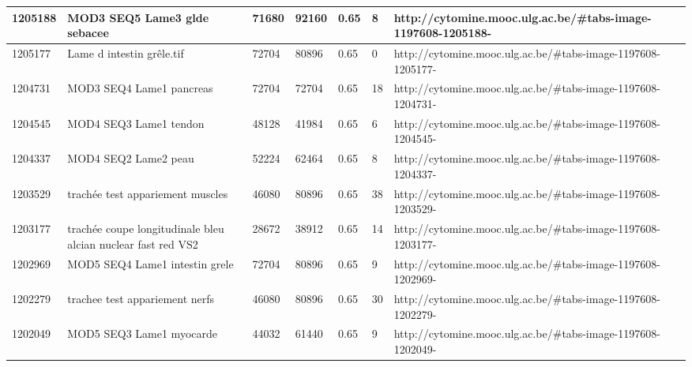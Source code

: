 \documentclass[a4paper,11pt]{report}
\numberwithin{figure}{section} %
\begin{document}
\begin{table}[]
{\begin{tabular}{|l|l|l|l|l|l|l|}
1205188  & MOD3 SEQ5 Lame3 glde sebacee                                                                 & 71680  & 92160  & 0.65                  & 8           & http://cytomine.mooc.ulg.ac.be/\#tabs-image-1197608-1205188-  \\ \hline
1205177  & Lame d intestin gr\^{e}le.tif                                                                    & 72704  & 80896  & 0.65                  & 0           & http://cytomine.mooc.ulg.ac.be/\#tabs-image-1197608-1205177-  \\ \hline
1204731  & MOD3 SEQ4 Lame1 pancreas                                                                     & 72704  & 72704  & 0.65                  & 18          & http://cytomine.mooc.ulg.ac.be/\#tabs-image-1197608-1204731-  \\ \hline
1204545  & MOD4 SEQ3 Lame1 tendon                                                                       & 48128  & 41984  & 0.65                  & 6           & http://cytomine.mooc.ulg.ac.be/\#tabs-image-1197608-1204545-  \\ \hline
1204337  & MOD4 SEQ2 Lame2 peau                                                                         & 52224  & 62464  & 0.65                  & 8           & http://cytomine.mooc.ulg.ac.be/\#tabs-image-1197608-1204337-  \\ \hline
1203529  & trach\'{e}e test appariement muscles                                                             & 46080  & 80896  & 0.65                  & 38          & http://cytomine.mooc.ulg.ac.be/\#tabs-image-1197608-1203529-  \\ \hline
1203177  & trach\'{e}e coupe longitudinale bleu alcian nuclear fast red VS2                                 & 28672  & 38912  & 0.65                  & 14          & http://cytomine.mooc.ulg.ac.be/\#tabs-image-1197608-1203177-  \\ \hline
1202969  & MOD5 SEQ4 Lame1 intestin grele                                                               & 72704  & 80896  & 0.65                  & 9           & http://cytomine.mooc.ulg.ac.be/\#tabs-image-1197608-1202969-  \\ \hline
1202279  & trachee test appariement nerfs                                                               & 46080  & 80896  & 0.65                  & 30          & http://cytomine.mooc.ulg.ac.be/\#tabs-image-1197608-1202279-  \\ \hline
1202049  & MOD5 SEQ3 Lame1 myocarde                                                                     & 44032  & 61440  & 0.65                  & 9           & http://cytomine.mooc.ulg.ac.be/\#tabs-image-1197608-1202049-  \\ \hline

\end{tabular}}
\end{table}
\end{document}

